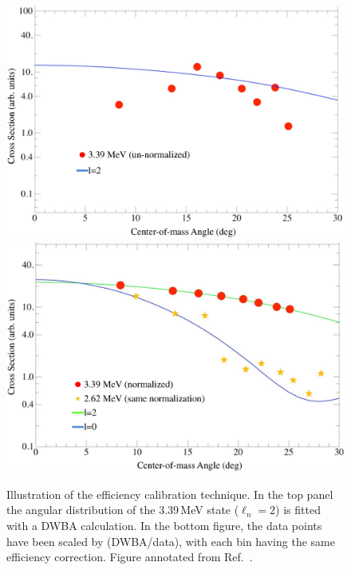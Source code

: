 \begin{figure}%
\centering
\includegraphics[height=0.45\textheight,width=\columnwidth,keepaspectratio]{More_Figures/b12_unnorm.eps}\\
\includegraphics[height=0.45\textheight,width=0.98\columnwidth,keepaspectratio]{More_Figures/b12_norm.eps}%
\caption[Illustration of the efficiency calibration technique]{Illustration of the efficiency calibration technique.  In the top panel the angular distribution of the 3.39\,MeV state ($\ell_n=2$) is fitted with a DWBA calculation.  In the bottom figure, the data points have been scaled by (DWBA/data), with each bin having the same efficiency correction. Figure annotated from Ref.~\cite{Schiffer_2009PC}.}%
\label{b12angdist2}%
\end{figure}

